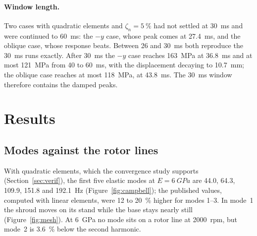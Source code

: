 \documentclass[11pt]{article}
\begin{document}
\paragraph{Window length.} Two cases with quadratic elements and $\zeta_n=\SI{5}{\%}$ had not settled at \SI{30}{ms}
and were continued to \SI{60}{ms}: the $-y$ case, whose peak comes at \SI{27.4}{ms}, and the oblique case, whose
response beats. Between 26 and \SI{30}{ms} both reproduce the \SI{30}{ms} runs exactly. After \SI{30}{ms} the
$-y$ case reaches 163~MPa at \SI{36.8}{ms} and at most \SI{121}{MPa} from 40 to \SI{60}{ms}, with the displacement
decaying to \SI{10.7}{mm}; the oblique case reaches at most \SI{118}{MPa}, at \SI{43.8}{ms}. The \SI{30}{ms}
window therefore contains the damped peaks.

\section{Results}\label{sec:res}

\subsection{Modes against the rotor lines}

With quadratic elements, which the convergence study supports (Section~\ref{sec:verif}), the first five elastic modes at
$E=\SI{6}{GPa}$ are 44.0, 64.3, 109.9, 151.8 and \SI{192.1}{Hz} (Figure~\ref{fig:campbell}); the published values,
computed with linear elements, were 12 to \SI{20}{\%} higher for modes 1--3. In mode~1 the shroud moves on its stand
while the base stays nearly still (Figure~\ref{fig:mesh}). At \SI{6}{GPa} no mode sits on a rotor line at
\SI{2000}{rpm}, but mode~2 is \SI{3.6}{\%} below the second harmonic.
\end{document}
